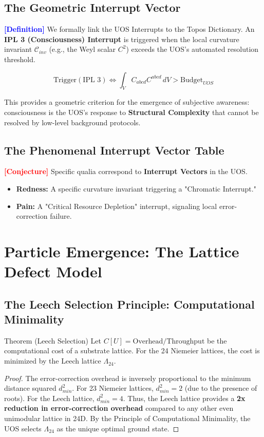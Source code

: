\documentclass[11pt,titlepage]{article}
\newcommand{\leech}{\Lambda_{24}}
\newcommand{\curvature}{\mathcal{C}}
\newcommand{\tagdef}{\textcolor{blue}{\textbf{[Definition]}} }
\newcommand{\tagconj}{\textcolor{red}{\textbf{[Conjecture]}} }
\begin{document}
\subsection{The Geometric Interrupt Vector}
\tagdef We formally link the UOS Interrupts to the Topos Dictionary. An \textbf{IPL 3 (Consciousness) Interrupt} is triggered when the local curvature invariant $\curvature_{inv}$ (e.g., the Weyl scalar $C^2$) exceeds the UOS's automated resolution threshold.

\begin{equation}
\text{Trigger}(\text{IPL 3}) \iff \int_{V} C_{abcd}C^{abcd} \, dV > \text{Budget}_{UOS}
\end{equation}

This provides a geometric criterion for the emergence of subjective awareness: consciousness is the UOS's response to \textbf{Structural Complexity} that cannot be resolved by low-level background protocols.

\subsection{The Phenomenal Interrupt Vector Table}
\tagconj Specific qualia correspond to \textbf{Interrupt Vectors} in the UOS.
\begin{itemize}
    
\item \textbf{Redness:} A specific curvature invariant triggering a "Chromatic Interrupt."
    
\item \textbf{Pain:} A "Critical Resource Depletion" interrupt, signaling local error-correction failure.
\end{itemize}


\section{Particle Emergence: The Lattice Defect Model}

\subsection{The Leech Selection Principle: Computational Minimality}
\begin{mytheorem}{Theorem (Leech Selection)}
Let $C[U] = \text{Overhead} / \text{Throughput}$ be the computational cost of a substrate lattice. For the 24 Niemeier lattices, the cost is minimized by the Leech lattice $\leech$.
\end{mytheorem}
\begin{proof}
The error-correction overhead is inversely proportional to the minimum distance squared $d_{min}^2$. For 23 Niemeier lattices, $d_{min}^2 = 2$ (due to the presence of roots). For the Leech lattice, $d_{min}^2 = 4$. Thus, the Leech lattice provides a \textbf{2x reduction in error-correction overhead} compared to any other even unimodular lattice in 24D. By the Principle of Computational Minimality, the UOS selects $\leech$ as the unique optimal ground state.
\end{proof}
\end{document}
